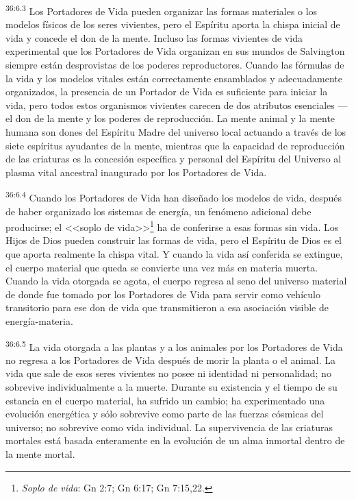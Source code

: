 \par
\textsuperscript{36:6.3} Los Portadores de Vida pueden organizar las formas materiales o los modelos físicos de los seres vivientes, pero el Espíritu aporta la chispa inicial de vida y concede el don de la mente. Incluso las formas vivientes de vida experimental que los Portadores de Vida organizan en sus mundos de Salvington siempre están desprovistas de los poderes reproductores. Cuando las fórmulas de la vida y los modelos vitales están correctamente ensamblados y adecuadamente organizados, la presencia de un Portador de Vida es suficiente para iniciar la vida, pero todos estos organismos vivientes carecen de dos atributos esenciales ---el don de la mente y los poderes de reproducción. La mente animal y la mente humana son dones del Espíritu Madre del universo local actuando a través de los siete espíritus ayudantes de la mente, mientras que la capacidad de reproducción de las criaturas es la concesión específica y personal del Espíritu del Universo al plasma vital ancestral inaugurado por los Portadores de Vida.

\par
\textsuperscript{36:6.4} Cuando los Portadores de Vida han diseñado los modelos de vida, después de haber organizado los sistemas de energía, un fenómeno adicional debe producirse; el <<soplo de vida>>\footnote{\textit{Soplo de vida}: Gn 2:7; Gn 6:17; Gn 7:15,22.} ha de conferirse a esas formas sin vida. Los Hijos de Dios pueden construir las formas de vida, pero el Espíritu de Dios es el que aporta realmente la chispa vital. Y cuando la vida así conferida se extingue, el cuerpo material que queda se convierte una vez más en materia muerta. Cuando la vida otorgada se agota, el cuerpo regresa al seno del universo material de donde fue tomado por los Portadores de Vida para servir como vehículo transitorio para ese don de vida que transmitieron a esa asociación visible de energía-materia.

\par
\textsuperscript{36:6.5} La vida otorgada a las plantas y a los animales por los Portadores de Vida no regresa a los Portadores de Vida después de morir la planta o el animal. La vida que sale de esos seres vivientes no posee ni identidad ni personalidad; no sobrevive individualmente a la muerte. Durante su existencia y el tiempo de su estancia en el cuerpo material, ha sufrido un cambio; ha experimentado una evolución energética y sólo sobrevive como parte de las fuerzas cósmicas del universo; no sobrevive como vida individual. La supervivencia de las criaturas mortales está basada enteramente en la evolución de un alma inmortal dentro de la mente mortal.

